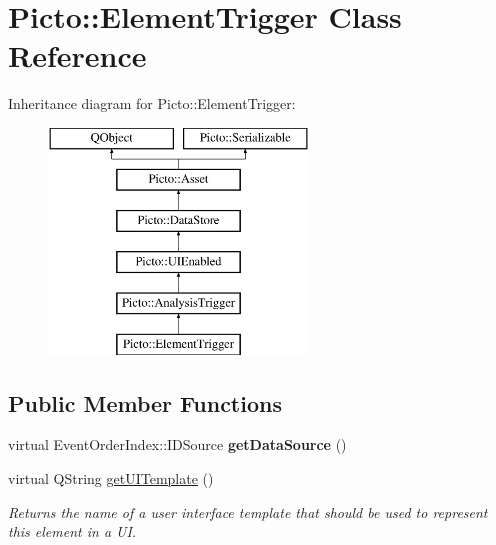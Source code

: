 \hypertarget{class_picto_1_1_element_trigger}{\section{Picto\-:\-:Element\-Trigger Class Reference}
\label{class_picto_1_1_element_trigger}
}
Inheritance diagram for Picto\-:\-:Element\-Trigger\-:\begin{figure}[H]
\begin{center}
\leavevmode
\includegraphics[height=6.000000cm]{class_picto_1_1_element_trigger}
\end{center}
\end{figure}
\subsection*{Public Member Functions}
\begin{DoxyCompactItemize}
\item 
\hypertarget{class_picto_1_1_element_trigger_a72382a287bac2e5fb83aaa68d8a913f2}{virtual Event\-Order\-Index\-::\-I\-D\-Source {\bfseries get\-Data\-Source} ()}\label{class_picto_1_1_element_trigger_a72382a287bac2e5fb83aaa68d8a913f2}

\item 
\hypertarget{class_picto_1_1_element_trigger_a11dcd0cbe2fa9851082d0c607f7cbb2e}{virtual Q\-String \hyperlink{class_picto_1_1_element_trigger_a11dcd0cbe2fa9851082d0c607f7cbb2e}{get\-U\-I\-Template} ()}\label{class_picto_1_1_element_trigger_a11dcd0cbe2fa9851082d0c607f7cbb2e}

\begin{DoxyCompactList}\small\item\em Returns the name of a user interface template that should be used to represent this element in a U\-I. \end{DoxyCompactList}\end{DoxyCompactItemize}
